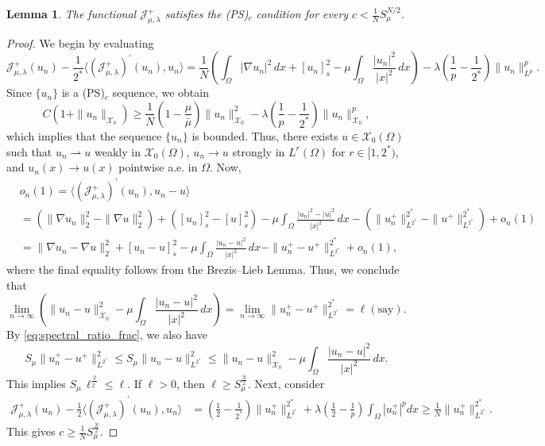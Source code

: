 \documentclass[11pt]{article}
\newtheorem{lemma}{Lemma}[section] %
\newcommand{\om} {\Omega}
\newcommand{\noi} {\noindent}
\newcommand{\X}{\mathcal{X}_0} %
\newcommand{\Jplus}{\mathcal{J}_{\mu,\lambda}^{+}} %
\begin{document}
\begin{lemma}\label{lem:ps_holds_superlinear}
The functional \( \Jplus \) satisfies the (PS)\(_c\) condition for every \( c < \frac{1}{N} S_{\mu}^{N/2} \). 
\end{lemma}
\begin{proof}
We begin by evaluating
\begin{equation*}
    \Jplus(u_n) - \frac{1}{2^*} \langle (\Jplus)^{\prime}(u_n), u_n \rangle = \frac{1}{N} \left( \int_{\Omega} |\nabla u_n|^2 \, dx + [u_n]^2_{s}  - \mu \int_{\Omega} \frac{|u_n|^2}{|x|^2} \, dx \right) 
    - \lambda \left( \frac{1}{p} - \frac{1}{2^*} \right) \|u_n\|_{L^p}^p.
\end{equation*}
Since \( \{u_n\} \) is a (PS)\(_c\) sequence, we obtain
\begin{equation*}
    C \left(1 + \|u_n\|_{{\X}}\right) \geq \frac{1}{N} \left(1 - \frac{\mu}{\bar{\mu}} \right) \|u_n\|_{\X}^2 
    - \lambda \left( \frac{1}{p} - \frac{1}{2^*} \right) \|u_n\|_{\X}^p,
\end{equation*}
which implies that the sequence \( \{u_n\} \) is bounded. Thus, there exists \( u \in \X(\Omega) \) such that $u_n \rightharpoonup u$ weakly in $\X(\om)$, $ u_n \rightarrow u$ strongly in $L^r(\om)$ for $r \in [1, 2^*)$, and $u_n(x) \rightarrow u(x)$ pointwise a.e. in $\om$.
\noi Now,
\begin{align*}
    &o_n(1)  = \langle (\Jplus)^{\prime}(u_n), u_n - u \rangle \\
    & = \left( \|\nabla u_n\|^2_2 - \|\nabla u\|^2_2 \right) +  \left( [u_n]^2_{s} - [u]^2_{s} \right)
    - \mu \int_{\Omega} \frac{|u_n|^2 - |u|^2}{|x|^2} \, dx - (\|u_n^+\|_{L^{2^*}}^{2^*} - \|u^+\|_{L^{2^*}}^{2^*}) + o_n(1) \\
    & = \|\nabla u_n - \nabla u\|^2_2 +  [u_n - u]^2_{s} 
    - \mu \int_{\Omega} \frac{|u_n - u|^2}{|x|^2} \, dx - \|u_n^+ - u^+\|_{L^{2^*}}^{2^*} + o_n(1),
\end{align*}
where the final equality follows from the Brezis–Lieb Lemma. Thus, we conclude that
\begin{equation*}
    \lim_{n \to \infty} \left( \|u_n - u\|^2_{\X} - \mu \int_{\Omega} \frac{|u_n - u|^2}{|x|^2} \, dx \right)
    = \lim_{n \to \infty} \|u_n^+ - u^+\|_{L^{2^*}}^{2^*} = \ell  (\text{say}).
\end{equation*}
By \eqref{eq:spectral_ratio_frac}, we also have
\begin{equation*}
   S_{\mu} \|u_n^+ - u^+\|_{L^{2^*}}^2 \leq S_{\mu} \|u_n - u\|_{L^{2^*}}^2 \leq \|u_n - u\|^2_{\X} - \mu \int_{\Omega} \frac{|u_n - u|^2}{|x|^2} \, dx.
\end{equation*}
This implies $ S_\mu \, \ell^{\frac{2}{2^*}} \leq \ell$.  If \( \ell > 0 \), then $\ell \geq S_\mu^{\frac{N}{2}}$. Next, consider
\begin{align*}
    \Jplus(u_n) - \frac{1}{2} \langle (\Jplus)^{\prime}(u_n), u_n \rangle 
    &= \left( \frac{1}{2} - \frac{1}{2^*} \right) \|u_n^+\|_{L^{2^*}}^{2^*} + \lambda \left( \frac{1}{2} - \frac{1}{p} \right)\int_{\Omega} |u_n^+|^p  dx \geq \frac{1}{N}\|u_n^+\|_{L^{2^*}}^{2^*}.
\end{align*}
This gives $c \geq \frac{1}{N}S_\mu^{\frac{N}{2}}$.
\end{proof}
\end{document}
